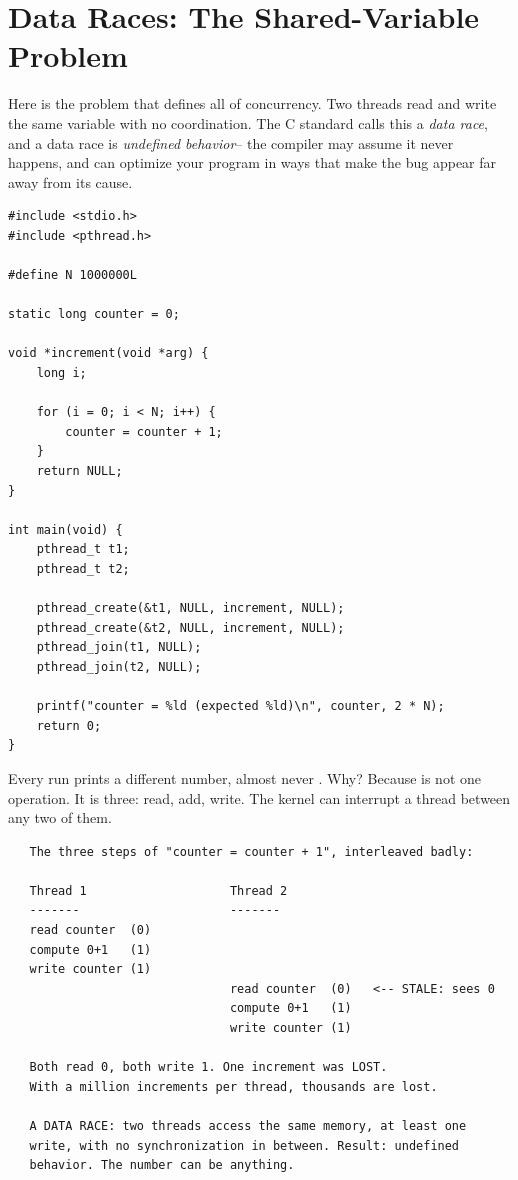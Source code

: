 \section{Data Races: The Shared-Variable Problem}

Here is the problem that defines all of concurrency. Two threads read
and write the same variable with no coordination. The C standard calls
this a \emph{data race}, and a data race is \emph{undefined behavior}--
the compiler may assume it never happens, and can optimize your
program in ways that make the bug appear far away from its cause.

\begin{lstlisting}[caption={The classic race: two threads, one counter.}]
#include <stdio.h>
#include <pthread.h>

#define N 1000000L

static long counter = 0;

void *increment(void *arg) {
    long i;

    for (i = 0; i < N; i++) {
        counter = counter + 1;
    }
    return NULL;
}

int main(void) {
    pthread_t t1;
    pthread_t t2;

    pthread_create(&t1, NULL, increment, NULL);
    pthread_create(&t2, NULL, increment, NULL);
    pthread_join(t1, NULL);
    pthread_join(t2, NULL);

    printf("counter = %ld (expected %ld)\n", counter, 2 * N);
    return 0;
}
\end{lstlisting}

Every run prints a different number, almost never .
Why? Because  is not one operation. It is
three: read, add, write. The kernel can interrupt a thread between any
two of them.

\begin{verbatim}
   The three steps of "counter = counter + 1", interleaved badly:

   Thread 1                    Thread 2
   -------                     -------
   read counter  (0)
   compute 0+1   (1)
   write counter (1)
                               read counter  (0)   <-- STALE: sees 0
                               compute 0+1   (1)
                               write counter (1)

   Both read 0, both write 1. One increment was LOST.
   With a million increments per thread, thousands are lost.

   A DATA RACE: two threads access the same memory, at least one
   write, with no synchronization in between. Result: undefined
   behavior. The number can be anything.
\end{verbatim}

